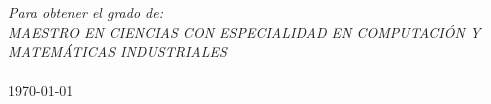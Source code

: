 \documentclass[
10pt, %
spanish, %
onehalfspacing,%
headsepline, %
]{MastersDoctoralThesis} %
\begin{document}
\begin{titlepage}
\begin{center}
 
\large \textit{Para obtener el grado de:}\\[0.3cm] %
\textit{MAESTRO EN CIENCIAS CON ESPECIALIDAD EN COMPUTACI\'ON Y MATEM\'ATICAS INDUSTRIALES}\\[0.4cm]
\deptname\\[2cm] %
 
{\large \today}\\[4cm] %
 
\vfill
\end{center}
\end{titlepage}


\end{document}
